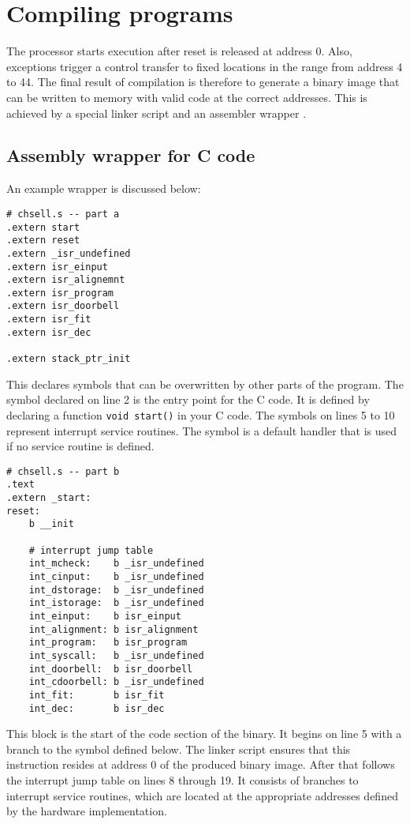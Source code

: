 \section{Compiling programs}

The processor starts execution after reset is released at address 0.
Also, exceptions trigger a control transfer to fixed locations in the range from address 4 to 44.
The final result of compilation is therefore to generate a binary image that can be written to memory with valid code at the correct addresses.
This is achieved by a special linker script  and an assembler wrapper .


\subsection{Assembly wrapper for C code}
An example wrapper is discussed below:
\begin{lstlisting}[language=powerasm]
# chsell.s -- part a
.extern start 
.extern reset
.extern _isr_undefined
.extern isr_einput
.extern isr_alignemnt
.extern isr_program
.extern isr_doorbell
.extern isr_fit
.extern isr_dec

.extern stack_ptr_init
\end{lstlisting}
This declares symbols that can be overwritten by other parts of the program.
The  symbol declared on line 2 is the entry point for the C code.
It is defined by declaring a function \texttt{void start()} in your C code.
The  symbols on lines 5 to 10 represent interrupt service routines.
The  symbol is a default handler that is used if no service routine is defined.

\begin{lstlisting}[language=powerasm]
# chsell.s -- part b
.text
.extern _start:
reset:
	b __init

	# interrupt jump table
	int_mcheck:    b _isr_undefined
	int_cinput:    b _isr_undefined
	int_dstorage:  b _isr_undefined
	int_istorage:  b _isr_undefined
	int_einput:    b isr_einput
	int_alignment: b isr_alignment 
	int_program:   b isr_program
	int_syscall:   b _isr_undefined
	int_doorbell:  b isr_doorbell
	int_cdoorbell: b _isr_undefined
	int_fit:       b isr_fit
	int_dec:       b isr_dec
\end{lstlisting}
This block is the start of the code section of the binary.
It begins on line 5 with a branch to the  symbol defined below.
The linker script ensures that this instruction resides at address 0 of the produced binary image.
After that follows the interrupt jump table on lines 8 through 19.
It consists of branches to interrupt service routines, which are located at the appropriate addresses defined by the hardware implementation.


